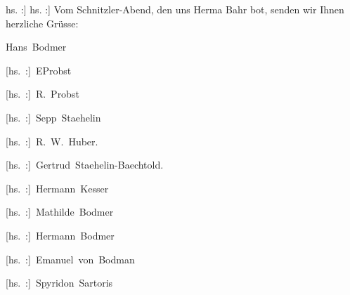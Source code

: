 \pstart
           \noindent{}{[}hs. :{]} \label{T_L01799-1v}\label{T_L01799-1}\pend
           \vspace{1em}
\pstart
           \noindent{}{\pb}{[}hs. :{]} Vom Schnitzler-Abend, den uns Herma{\geminationn} Bahr bot, senden wir Ihnen herzliche Grüsse:\pend
           
\pstart
           \spacefill\mbox{Hans Bodmer}\pend
           
\pstart
           \spacefill\mbox{{[}hs. :{]} EProbst}\pend
           
\pstart
           \spacefill\mbox{{[}hs. :{]} R. Probst}\pend
           
\pstart
           \spacefill\mbox{{[}hs. :{]} Sepp Staehelin}\pend
           
\pstart
           \spacefill\mbox{{[}hs. :{]} R. W. Huber.}\pend
           
\pstart
           \spacefill\mbox{{[}hs. :{]} Gertrud Staehelin-Baechtold.}\pend
           
\pstart
           \spacefill\mbox{{[}hs. :{]} Hermann Kesser}\pend
           
\pstart
           \spacefill\mbox{{[}hs. :{]} Mathilde Bodmer}\pend
           
\pstart
           \spacefill\mbox{{[}hs. :{]} Hermann Bodmer}\pend
           
\pstart
           \spacefill\mbox{{[}hs. :{]} Emanuel von Bodman}\pend
           
\pstart
           \spacefill\mbox{{[}hs. :{]} Spyridon Sartoris}\pend
           
